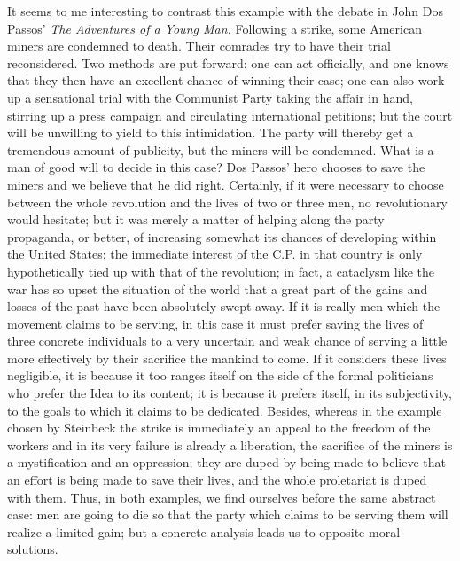\documentclass[11pt]{article}
\begin{document}
{{It seems to me interesting to contrast this example with the debate in John Dos Passos’ \textit{The Adventures of a Young Man. }Following a strike, some American miners are condemned to death. Their comrades try to have their trial reconsidered. Two methods are put forward: one can act officially, and one knows that they then have an excellent chance of winning their case; one can also work up a sensational trial with the Communist Party taking the affair in hand, stirring up a press campaign and circulating international petitions; but the court will be unwilling to yield to this intimidation. The party will thereby get a tremendous amount of publicity, but the miners will be condemned. What is a man of good will to decide in this case? Dos Passos’ hero chooses to save the miners and we believe that he did right. Certainly, if it were necessary to choose between the whole revolution and the lives of two or three men, no revolutionary would hesitate; but it was merely a matter of helping along the party propaganda, or better, of increasing somewhat its chances of developing within the United States; the immediate interest of the C.P. in that country is only hypothetically tied up with that of the revolution; in fact, a cataclysm like the war has so upset the situation of the world that a great part of the gains and losses of the past have been absolutely swept away. If it is really men which the movement claims to be serving, in this case it must prefer saving the lives of three concrete individuals to a very uncertain and weak chance of serving a little more effectively by their sacrifice the mankind to come. If it considers these lives negligible, it is because it too ranges itself on the side of the formal politicians who prefer the Idea to its content; it is because it prefers itself, in its subjectivity, to the goals to which it claims to be dedicated. Besides, whereas in the example chosen by Steinbeck the strike is immediately an appeal to the freedom of the workers and in its very failure is already a liberation, the sacrifice of the miners is a mystification and an oppression; they are duped by being made to believe that an effort is being made to save their lives, and the whole proletariat is duped with them. Thus, in both examples, we find ourselves before the same abstract case: men are going to die so that the party which claims to be serving them will realize a limited gain; but a concrete analysis leads us to opposite moral solutions.

}}
\end{document}
